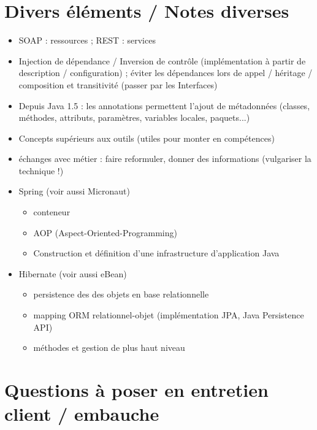 \documentclass[11pt,twoside,a4paper]{article}
\begin{document}
\begin{landscape}
\begin{multicols}{2}
	\vfill
	
	\columnbreak
	
	
	\section*{Divers {\'e}l{\'e}ments / Notes diverses}
	
	\begin{itemize}
		\item SOAP : ressources ; REST : services
		\item Injection de d{\'e}pendance / Inversion de contr{\^o}le (impl{\'e}mentation {\`a} partir de description / configuration) ; {\'e}viter les d{\'e}pendances lors de appel / h{\'e}ritage / composition et transitivit{\'e} (passer par les Interfaces)
		\item Depuis Java 1.5 : les annotations permettent l'ajout de m{\'e}tadonn{\'e}es (classes, m{\'e}thodes, attributs, param{\`e}tres, variables locales, paquets...)
		\item Concepts sup{\'e}rieurs aux outils (utiles pour monter en comp{\'e}tences)
		\item {\'e}changes avec m{\'e}tier : faire reformuler, donner des informations (vulgariser la technique !)
		\item Spring (voir aussi Micronaut)
		\begin{itemize}
			\item conteneur
			\item AOP (Aspect-Oriented-Programming)
			\item Construction et d{\'e}finition d'une infrastructure d'application Java
		\end{itemize}
		\item Hibernate (voir aussi eBean)
		\begin{itemize}
			\item persistence des des objets en base relationnelle
			\item mapping ORM relationnel-objet (impl{\'e}mentation JPA, Java Persistence API)
			\item m{\'e}thodes et gestion de plus haut niveau
		\end{itemize}
	\end{itemize}
	
	\section*{Questions {\`a} poser en entretien client / embauche}
	

\end{multicols}
\end{landscape}
\end{document}

